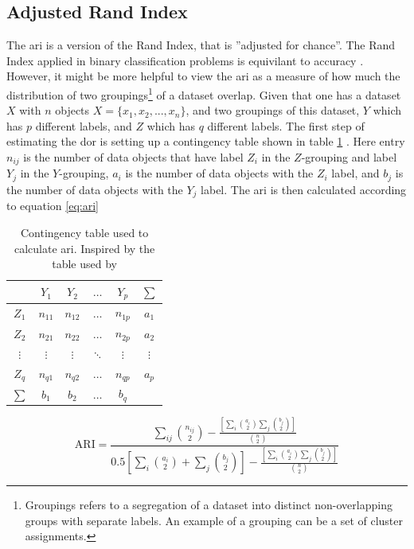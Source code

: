 \subsection{Adjusted Rand Index}
The \acrfull{ari} is a version of the Rand Index, that is ''adjusted for chance''. The Rand Index applied in binary classification problems is equivilant to accuracy \cite{ari_wikipedia}. However, it might be more helpful to view the \acrshort{ari} as a measure of how much the distribution of two groupings\footnote{Groupings refers to a segregation of a dataset into distinct non-overlapping groups with separate labels. An example of a grouping can be a set of cluster assignments.} of a dataset overlap. Given that one has a dataset $X$ with $n$ objects $X = \{x_1, x_2, ..., x_n\}$, and two groupings of this dataset, $Y$ which has $p$ different labels, and $Z$ which has $q$ different labels. The first step of estimating the \acrshort{dor} is setting up a contingency table shown in table \ref{tab:cont} \cite{ari_wikipedia}. Here entry $n_{ij}$ is the number of data objects that have label $Z_i$ in the $Z$-grouping and label $Y_j$ in the $Y$-grouping, $a_i$ is the number of data objects with the $Z_i$ label, and $b_j$ is the number of data objects with the $Y_j$ label. The \acrshort{ari} is then calculated according to equation \eqref{eq:ari}

\begin{table}
    \centering
    \begin{tabular}{c|cccc|c}
        \toprule
                 &  $Y_1$   &  $Y_2$   & $\hdots$ & $Y_p$    & $\sum$ \\
        \midrule
        $Z_1$    & $n_{11}$ & $n_{12}$ & $\hdots$ & $n_{1p}$ & $a_1$ \\
        \midrule
        $Z_2$    & $n_{21}$ & $n_{22}$ & $\hdots$ & $n_{2p}$ & $a_2$ \\
        \midrule
        $\vdots$ & $\vdots$ & $\vdots$ & $\ddots$ & $\vdots$ & $\vdots$ \\
        \midrule
        $Z_q$    & $n_{q1}$ & $n_{q2}$ & $\hdots$ & $n_{qp}$ & $a_p$ \\
        \midrule
        $\sum$   &  $b_1$   &  $b_2$   & $\hdots$ &  $b_q$   &
    \end{tabular}
    \caption{Contingency table used to calculate \acrshort{ari}. Inspired by the table used by \cite{ari_wikipedia}}
    \label{tab:cont}
\end{table}

\begin{equation}
    \mathrm{ARI} = \frac{\sum_{ij} \binom{n_{ij}}{2} - \frac{\left [ \sum_i \binom{a_i}{2} \sum_j \binom{b_j}{2} \right ]}{\binom{n}{2}} }{0.5\left [ \sum_i \binom{a_i}{2} + \sum_j \binom{b_j}{2} \right ] - \frac{\left [ \sum_i \binom{a_i}{2} \sum_j \binom{b_j}{2} \right ]}{\binom{n}{2}}}
    \label{eq:ari}
\end{equation}

